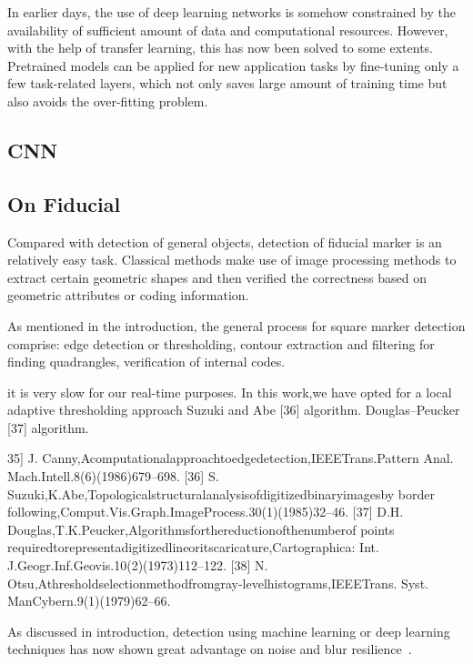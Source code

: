 \documentclass[a4paper]{report}
\begin{document}
In earlier days, the use of deep learning networks is somehow constrained by the availability of sufficient amount of data and computational resources. However, with the help of transfer learning, this has now been solved to some extents. Pretrained models can be applied for new application tasks by fine-tuning only a few task-related layers, which not only saves large amount of training time but also avoids the over-fitting problem.


\subsection{CNN}






\subsection{On Fiducial}
Compared with detection of general objects, detection of fiducial marker is an relatively easy task. Classical methods make use of image processing methods to extract certain geometric shapes and then verified the correctness based on geometric attributes or coding information. 

As mentioned in the introduction, the general process for square marker detection comprise: edge detection or thresholding, contour extraction and filtering for finding quadrangles, verification of internal codes. 


it is very slow for our real-time purposes.
In this work,we have opted for a local adaptive thresholding approach 
Suzuki and Abe [36] algorithm. 
Douglas–Peucker [37] algorithm. 

35] J. Canny,Acomputationalapproachtoedgedetection,IEEETrans.Pattern
Anal. Mach.Intell.8(6)(1986)679–698.
[36] S. Suzuki,K.Abe,Topologicalstructuralanalysisofdigitizedbinaryimagesby
border following,Comput.Vis.Graph.ImageProcess.30(1)(1985)32–46.
[37] D.H. Douglas,T.K.Peucker,Algorithmsforthereductionofthenumberof
points requiredtorepresentadigitizedlineoritscaricature,Cartographica:
Int. J.Geogr.Inf.Geovis.10(2)(1973)112–122.
[38] N. Otsu,Athresholdselectionmethodfromgray-levelhistograms,IEEETrans.
Syst. ManCybern.9(1)(1979)62–66.



As discussed in introduction, detection using machine learning or deep learning techniques has now shown great advantage on noise and blur resilience~\cite{prasad2015motion}.
\end{document}
